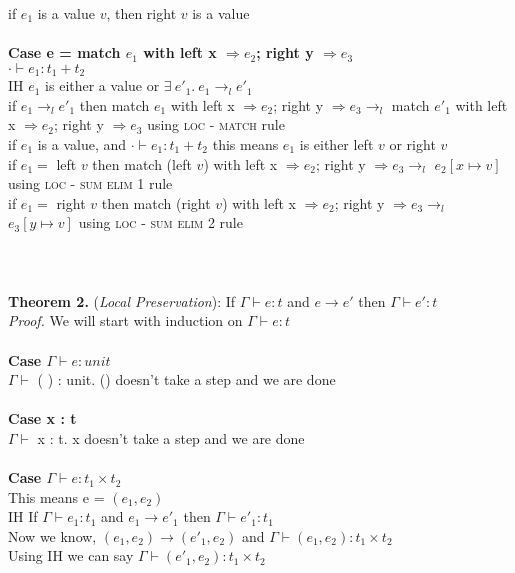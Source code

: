 \documentclass{article}
\begin{document}
if $e_1$ is a value $v$, then right $v$ is a value\\ \\
\textbf{Case e = match $e_1$ with left x $\Rightarrow e_2$; right y $\Rightarrow e_3$}\\
$\cdot \vdash e_1: t_1 + t_2$\\
IH $e_1$ is either a value or $  \exists \ e'_1.\ e_1 \to_l e'_1 $ \\
if $e_1 \to_l e'_1$ then match $e_1$ with left x $\Rightarrow e_2$; right y $\Rightarrow e_3 \to_l$ match $e'_1$ with left x $\Rightarrow e_2$; right y $\Rightarrow e_3$ using \textsc{loc - match} rule\\
if $e_1$ is a value, and $\cdot \vdash e_1: t_1 + t_2$ this means $e_1$ is either left $v$ or right $v$\\
if $e_1 = $ left $v$ then match (left $v$) with left x $\Rightarrow e_2$; right y $\Rightarrow e_3 \to_l$ $e_2[x \mapsto v]$ using \textsc{loc - sum elim 1} rule\\
if $e_1 = $ right $v$ then match (right $v$) with left x $\Rightarrow e_2$; right y $\Rightarrow e_3 \to_l$ $e_3[y \mapsto v]$ using \textsc{loc - sum elim 2} rule\\
\\\\ 
\\
\textbf{Theorem 2.} (\textit{Local Preservation}): If $\Gamma \vdash e : t$ and  $e \to e'$ then $\Gamma \vdash e' : t$
  \\
\textit{Proof.} We will start with induction on $\Gamma \vdash e : t$ \\\\
\textbf{Case $\Gamma \vdash e : unit$} \\
 $\Gamma \vdash $ ( ) : unit. () doesn't take a step and we are done \\ \\
\textbf{Case x : t}      \\ 
$\Gamma \vdash $ x : t. x doesn't take a step and we are done \\ \\
\textbf{Case $\Gamma \vdash e : t_1 \times t_2$ } \\
This means e = $(e_1, e_2)$ \\
IH If $\Gamma \vdash e_1 : t_1$ and  $e_1 \to e'_1$ then $\Gamma \vdash e'_1 : t_1$ \\
Now we know, $(e_1,e_2) \to (e'_1, e_2)$ and $\Gamma \vdash (e_1, e_2) : t_1 \times t_2$ \\
Using IH we can say $\Gamma \vdash (e'_1, e_2) : t_1 \times t_2$ \\\\
\end{document}
